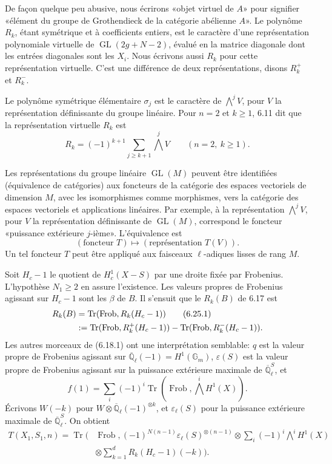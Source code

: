 \documentclass[10pt]{article}
\newcommand{\Ql}{\overline{\mathbb Q}_{\ell}}
\newcommand{\Gm}{\mathbb G_m}
\newcommand{\GL}{\operatorname{GL}}
\newcommand{\Frob}{\operatorname{Frob}}
\newcommand{\Tr}{\operatorname{Tr}}
\theoremstyle{deligne}
\newcommand{\heading}[1]{\vspace{0.7em}\noindent{\bfseries #1}\quad}
\begin{document}
\heading{6.22.} De façon quelque peu abusive, nous écrirons «objet virtuel de $A$» pour signifier «élément du groupe de Grothendieck de la catégorie abélienne $A$». Le polynôme $R_k$, étant symétrique et à coefficients entiers, est le caractère d'une représentation polynomiale virtuelle de $\GL(2g+N-2)$, évalué en la matrice diagonale dont les entrées diagonales sont les $X_i$. Nous écrivons aussi $R_k$ pour cette représentation virtuelle. C'est une différence de deux représentations, disons $R_k^+$ et $R_k^-$.

\heading{Exemple 6.23.} Le polynôme symétrique élémentaire $\sigma_j$ est le caractère de $\bigwedge^j V$, pour $V$ la représentation définissante du groupe linéaire. Pour $n=2$ et $k\ge1$, 6.11 dit que la représentation virtuelle $R_k$ est
\begin{equation}\tag{6.23.1}
R_k=(-1)^{k+1}\sum_{j\ge k+1}\bigwedge^jV\qquad(n=2,\ k\ge1).
\end{equation}

\heading{6.24.} Les représentations du groupe linéaire $\GL(M)$ peuvent être identifiées (équivalence de catégories) aux foncteurs de la catégorie des espaces vectoriels de dimension $M$, avec les isomorphismes comme morphismes, vers la catégorie des espaces vectoriels et applications linéaires. Par exemple, à la représentation $\bigwedge^jV$, pour $V$ la représentation définissante de $\GL(M)$, correspond le foncteur «puissance extérieure $j$-ième». L'équivalence est
\[
(\text{foncteur }T)\longmapsto (\text{représentation }T(V)).
\]
Un tel foncteur $T$ peut être appliqué aux faisceaux $\ell$-adiques lisses de rang $M$.

\heading{6.25.} Soit $H_c-1$ le quotient de $H^1_c(X-S)$ par une droite fixée par Frobenius. L'hypothèse $N_1\ge2$ en assure l'existence. Les valeurs propres de Frobenius agissant sur $H_c-1$ sont les $\beta$ de $B$. Il s'ensuit que le $R_k(B)$ de 6.17 est
\begin{align}
R_k(B)&=\Tr(\Frob,R_k(H_c-1))\tag{6.25.1}\\
&:=\Tr(\Frob,R_k^+(H_c-1))-\Tr(\Frob,R_k^-(H_c-1)).\notag
\end{align}
Les autres morceaux de (6.18.1) ont une interprétation semblable: $q$ est la valeur propre de Frobenius agissant sur $\Ql(-1)=H^1(\Gm)$, $\varepsilon(S)$ est la valeur propre de Frobenius agissant sur la puissance extérieure maximale de $\Ql^S$, et
\[
f(1)=\sum_i(-1)^i\Tr(\Frob,\bigwedge^iH^1(X)).
\]
Écrivons $W(-k)$ pour $W\otimes\Ql(-1)^{\otimes k}$, et $\varepsilon_\ell(S)$ pour la puissance extérieure maximale de $\Ql^S$. On obtient
\begin{equation}\tag{6.25.2}
\begin{aligned}
T(X_1,S_1,n)=\Tr\Bigg(&\Frob,
(-1)^{N(n-1)}\varepsilon_\ell(S)^{\otimes(n-1)}\otimes
\sum_i(-1)^i\bigwedge^iH^1(X)\\
&\otimes\sum_{k=1}^d R_k(H_c-1)(-k)\Bigg).
\end{aligned}
\end{equation}
\end{document}
